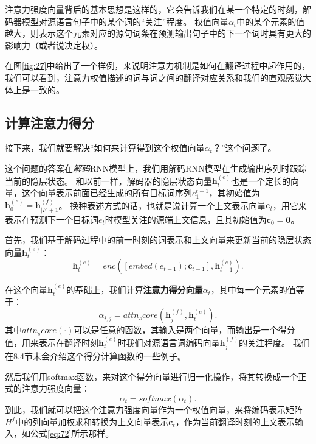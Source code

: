 \documentclass[10pt,a4paper]{ctexart}
\begin{document}
注意力强度向量背后的基本思想是这样的，它会告诉我们在某一个特定的时刻，解码器模型对源语言句子中的某个词的“关注”程度。
权值向量$\textbf{$\alpha$}_t$中的某个元素的值越大，则表示这个元素对应的源句词条在预测输出句子中的下一个词时具有更大的影响力（或者说决定权）。

在图\ref{fig:27}中给出了一个样例，来说明注意力机制是如何在翻译过程中起作用的，我们可以看到，注意力权值描述的词与词之间的翻译对应关系和我们的直观感觉大体上是一致的。

\subsection{计算注意力得分}
接下来，我们就要解决“如何来计算得到这个权值向量$\textbf{$\alpha$}_t$？”这个问题了。

这个问题的答案在\textit{解码}RNN模型上，我们用解码RNN模型在生成输出序列时跟踪当前的隐层状态。
和以前一样，解码器的隐层状态向量$\textbf{h}_t^{(e)}$也是一个定长的向量，这个向量表示前面已经生成的所有目标词序列$e_1^{t-1}$，其初始值为$\textbf{h}_0^{(e)} = \textbf{h}_{|F|+1}^{(f)}$。
换种表述方式的话，也就是说计算一个上文表示向量$\textbf{c}_t$，用它来表示在预测下一个目标词$e_t$时模型关注的源端上文信息，且其初始值为$\textbf{c}_0 = \textbf{0}$。

首先，我们基于解码过程中的前一时刻的词表示和上文向量来更新当前的隐层状态向量$\textbf{h}_t^{(e)}$：
\begin{equation}\label{eq:73}
 \textbf{h}_t^{(e)} = enc([embed(e_{t-1});\textbf{c}_{t-1}],\textbf{h}_{t-1}^{(e)}).
\end{equation}

在这个向量$\textbf{h}_t^{(e)}$的基础上，我们计算\textbf{注意力得分向量$\alpha_t$}，其中每一个元素的值等于：
\begin{equation}\label{eq:74}
 \alpha_{i,j} = attn_score(\textbf{h}_j^{(f)},\textbf{h}_t^{(e)}).
\end{equation}
其中$attn_score(\cdot)$可以是任意的函数，其输入是两个向量，而输出是一个得分值，用来表示在翻译时刻$\textbf{h}_t^{(e)}$时我们对源语言词编码向量$\textbf{h}_j^{(f)}$的关注程度。
我们在8.4节末会介绍这个得分计算函数的一些例子。

然后我们用softmax函数，来对这个得分向量进行归一化操作，将其转换成一个正式的注意力强度向量：
\begin{equation}\label{eq:75}
 \textbf{$\alpha$}_t = softmax(\textbf{$\alpha$}_t).
\end{equation}
到此，我们就可以把这个注意力强度向量作为一个权值向量，来将编码表示矩阵$H^{f}$中的列向量加权求和转换为上文向量表示$\textbf{c}_t$，作为当前翻译时刻的上文表示输入，如公式\ref{eq:72}所示那样。
\end{document}
